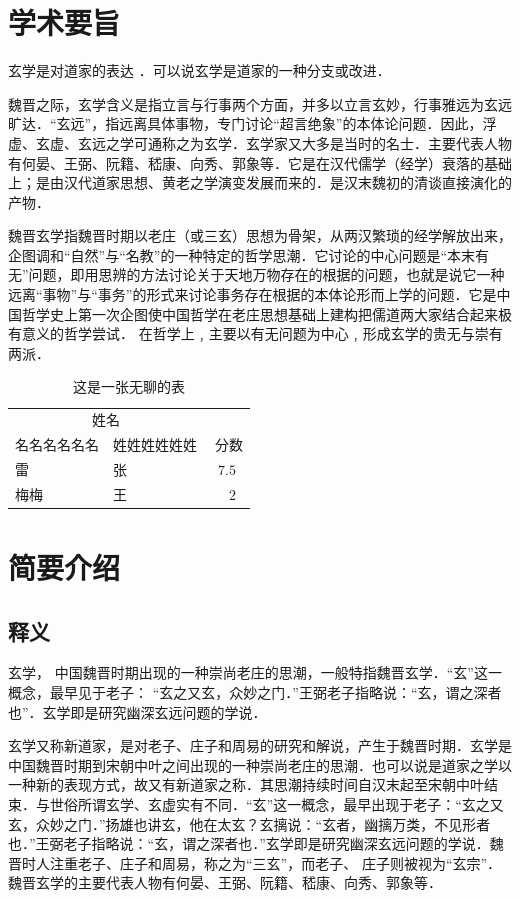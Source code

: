 

\section{学术要旨}
玄学是对道家的表达 ．可以说玄学是道家的一种分支或改进．

魏晋之际，玄学含义是指立言与行事两个方面，并多以立言玄妙，行事雅远为玄远旷达．“玄远”，指远离具体事物，专门讨论“超言绝象”的本体论问题．因此，浮虚、玄虚、玄远之学可通称之为玄学．玄学家又大多是当时的名士．主要代表人物有何晏、王弼、阮籍、嵇康、向秀、郭象等．它是在汉代儒学（经学）衰落的基础上；是由汉代道家思想、黄老之学演变发展而来的\cite{Figueredo:2009dg}．是汉末魏初的清谈直接演化的产物．

魏晋玄学指魏晋时期以老庄（或三玄）思想为骨架，从两汉繁琐的经学解放出来，企图调和“自然”与“名教”的一种特定的哲学思潮．它讨论的中心问题是“本末有无”问题，即用思辨的方法讨论关于天地万物存在的根据的问题，也就是说它一种远离“事物”与“事务”的形式来讨论事务存在根据的本体论形而上学的问题．它是中国哲学史上第一次企图使中国哲学在老庄思想基础上建构把儒道两大家结合起来极有意义的哲学尝试． 在哲学上﹐主要以有无问题为中心﹐形成玄学的贵无与崇有两派．

\begin{table}[hbt]
	\caption{这是一张无聊的表}
	\centering
	\begin{tabular}{llr}
		\toprule
		\multicolumn{2}{c}{姓名} \\
		\cmidrule(r){1-2}
		名名名名名名 & 姓姓姓姓姓姓 & 分数 \\
		\midrule
		雷 & 张 &~$7.5$~\\
		梅梅 & 王 &~$2$~\\
		\bottomrule
	\end{tabular}
	\label{tab:label}
\end{table}

\section{简要介绍}


\subsection{释义}

玄学， 中国魏晋时期出现的一种崇尚老庄的思潮，一般特指魏晋玄学．“玄”这一概念，最早见于老子：
“玄之又玄，众妙之门．”王弼老子指略说：“玄，谓之深者也”．玄学即是研究幽深玄远问题的学说．

玄学又称新道家，是对老子、庄子和周易的研究和解说，产生于魏晋时期．玄学是中国魏晋时期到宋朝中叶之间出现的一种崇尚老庄的思潮．也可以说是道家之学以一种新的表现方式，故又有新道家之称．其思潮持续时间自汉末起至宋朝中叶结束．与世俗所谓玄学、玄虚实有不同．“玄”这一概念，最早出现于老子：“玄之又玄，众妙之门．”扬雄也讲玄，他在太玄？玄摛说：“玄者，幽摛万类，不见形者也．”王弼老子指略说：“玄，谓之深者也．”玄学即是研究幽深玄远问题的学说．魏晋时人注重老子、庄子和周易，称之为“三玄”，而老子、
庄子则被视为“玄宗”．魏晋玄学的主要代表人物有何晏、王弼、阮籍、嵇康、向秀、郭象等．

